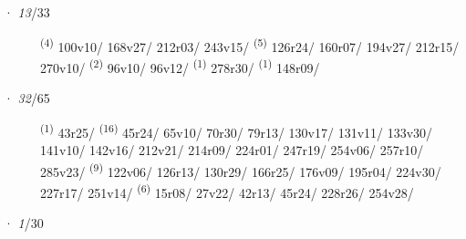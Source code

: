 \ENTRYEND
\noindent{} · \textit{13}/33 \LEMMALINE
\begin{description}
    \item[]  \textsuperscript{(4)} \mbox{100v10/} \mbox{168v27/} \mbox{212r03/} \mbox{243v15/} \CASEBREAK {} \textsuperscript{(5)} \mbox{126r24/} \mbox{160r07/} \mbox{194v27/} \mbox{212r15/} \mbox{270v10/} \CASEBREAK {} \textsuperscript{(2)} \mbox{96v10/} \mbox{96v12/} \textsuperscript{(1)} \mbox{278r30/} \CASEBREAK {} \textsuperscript{(1)} \mbox{148r09/}
\end{description}
\ENTRYEND
\noindent{} · \textit{32}/65 \LEMMALINE
\begin{description}
    \item[]  \textsuperscript{(1)} \mbox{43r25/} \textsuperscript{(16)} \mbox{45r24/} \mbox{65v10/} \mbox{70r30/} \mbox{79r13/} \mbox{130v17/} \mbox{131v11/} \mbox{133v30/} \mbox{141v10/} \mbox{142v16/} \mbox{212v21/} \mbox{214r09/} \mbox{224r01/} \mbox{247r19/} \mbox{254v06/} \mbox{257r10/} \mbox{285v23/} \CASEBREAK {} \textsuperscript{(9)} \mbox{122v06/} \mbox{126r13/} \mbox{130r29/} \mbox{166r25/} \mbox{176v09/} \mbox{195r04/} \mbox{224v30/} \mbox{227r17/} \mbox{251v14/} \CASEBREAK {} \textsuperscript{(6)} \mbox{15r08/} \mbox{27v22/} \mbox{42r13/} \mbox{45r24/} \mbox{228r26/} \mbox{254v28/}
\end{description}
\ENTRYEND
\noindent{} · \textit{1}/30 \LEMMALINE
